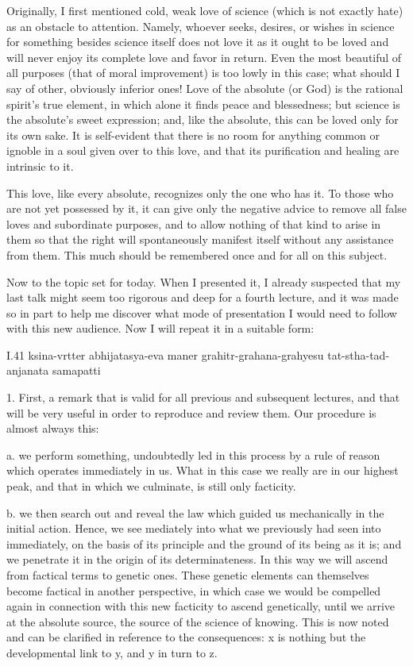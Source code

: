 Originally, I first mentioned cold, weak love of science
(which is not exactly hate) as an obstacle to attention.
Namely, whoever seeks, desires, or wishes in science
for something besides science itself does not love it
as it ought to be loved and will never enjoy
its complete love and favor in return.
Even the most beautiful of all purposes
(that of moral improvement)
is too lowly in this case;
what should I say of other, obviously inferior ones!
Love of the absolute (or God) is the rational spirit’s true element,
in which alone it finds peace and blessedness;
but science is the absolute’s sweet expression;
and, like the absolute, this can be loved only for its own sake.
It is self-evident that there is no room for anything
common or ignoble in a soul given over to this love,
and that its purification and healing are intrinsic to it.

This love, like every absolute,
recognizes only the one who has it.
To those who are not yet possessed by it,
it can give only the negative advice to remove
all false loves and subordinate purposes,
and to allow nothing of that kind to arise in them
so that the right will spontaneously manifest itself
without any assistance from them.
This much should be remembered
once and for all on this subject.

Now to the topic set for today.
When I presented it, I already suspected that
my last talk might seem too rigorous and
deep for a fourth lecture,
and it was made so in part to help me
discover what mode of presentation
I would need to follow with this new audience.
Now I will repeat it in a suitable form:

I.41
ksina-vrtter abhijatasya-eva maner
grahitr-grahana-grahyesu tat-stha-tad-anjanata samapatti

1. First, a remark that is valid
for all previous and subsequent lectures,
and that will be very useful in order
to reproduce and review them.
Our procedure is almost always this:

a. we perform something, undoubtedly led in this process
by a rule of reason which operates immediately in us.
What in this case we really are in our highest peak,
and that in which we culminate, is still only facticity.

b. we then search out and reveal the law
which guided us mechanically in the initial action.
Hence, we see mediately into what we previously
had seen into immediately,
on the basis of its principle
and the ground of its being as it is;
and we penetrate it in the origin
of its determinateness.
In this way we will ascend
from factical terms to genetic ones.
These genetic elements can themselves
become factical in another perspective,
in which case we would be compelled again
in connection with this new facticity
to ascend genetically,
until we arrive at the absolute source,
the source of the science of knowing.
This is now noted and can be clarified
in reference to the consequences:
x is nothing but the developmental link to y,
and y in turn to z.

